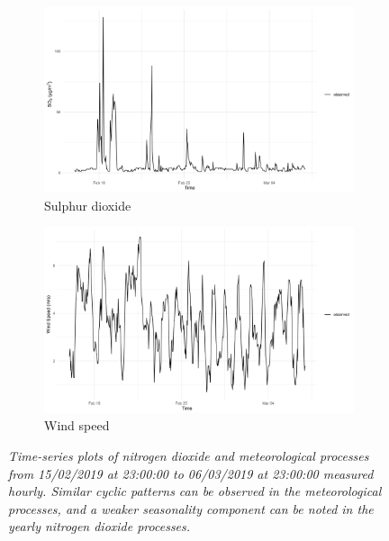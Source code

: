 \begin{figure}[H]
            \begin{subfigure}{0.48\linewidth}
               \centering
               \includegraphics[width=\linewidth]{../images/subset_data_so2.png}
            \caption{Sulphur dioxide}
            \end{subfigure}
            \hfill
            \begin{subfigure}{0.48\linewidth}
               \centering
               \includegraphics[width=\linewidth]{../images/subset_data_speed.png}
               \caption{Wind speed}
            \end{subfigure}

            \caption{\textit{Time-series plots of nitrogen dioxide and meteorological processes from 15/02/2019 at 23:00:00 to 06/03/2019 at 23:00:00 measured hourly. Similar cyclic patterns can be observed in the meteorological processes, and a weaker seasonality component can be noted in the yearly nitrogen dioxide processes.}}
         \end{figure}


